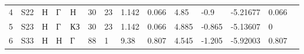\begin{tabular}{|l|l|l|l|l|l|l|l|l|l|l|l|l|l}
4                                        & S22                                            & Н      & Г       & Н      & 30                                              & 23                                              & 1.142                                   & 0.066                                     & 4.85                                            & -0.9                                             & -5.21677                                          & 0.066                                          &  \\ \cline{1-13}
5                                        & S23                                            & Н      & Г       & КЗ     & 30                                              & 23                                              & 1.142                                   & 0.066                                     & 4.885                                           & -0.865                                           & -5.13607                                          & 0                                              &  \\ \cline{1-13}
6                                        & S33                                            & Н      & Н       & Г      & 88                                              & 1                                               & 9.38                                    & 0.807                                     & 4.545                                           & -1.205                                           & -5.92003                                          & 0.807                                          &  \\ \cline{1-13}
\end{tabular}
